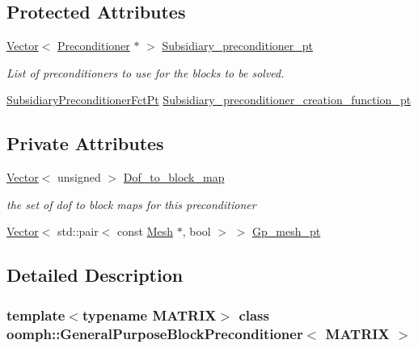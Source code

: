 \subsection*{Protected Attributes}
\begin{DoxyCompactItemize}
\item 
\hyperlink{classoomph_1_1Vector}{Vector}$<$ \hyperlink{classoomph_1_1Preconditioner}{Preconditioner} $\ast$ $>$ \hyperlink{classoomph_1_1GeneralPurposeBlockPreconditioner_a6bbfedf5de19fd5ee595e73dd8853d41}{Subsidiary\+\_\+preconditioner\+\_\+pt}
\begin{DoxyCompactList}\small\item\em List of preconditioners to use for the blocks to be solved. \end{DoxyCompactList}\item 
\hyperlink{classoomph_1_1GeneralPurposeBlockPreconditioner_a4818c6bde7206cd9b5df4f8c1e3a3c34}{Subsidiary\+Preconditioner\+Fct\+Pt} \hyperlink{classoomph_1_1GeneralPurposeBlockPreconditioner_a5c29b06a7668e63309cfe27efdf1a60a}{Subsidiary\+\_\+preconditioner\+\_\+creation\+\_\+function\+\_\+pt}
\end{DoxyCompactItemize}
\subsection*{Private Attributes}
\begin{DoxyCompactItemize}
\item 
\hyperlink{classoomph_1_1Vector}{Vector}$<$ unsigned $>$ \hyperlink{classoomph_1_1GeneralPurposeBlockPreconditioner_a098199f5d175c6357aa74d2b40f4540d}{Dof\+\_\+to\+\_\+block\+\_\+map}
\begin{DoxyCompactList}\small\item\em the set of dof to block maps for this preconditioner \end{DoxyCompactList}\item 
\hyperlink{classoomph_1_1Vector}{Vector}$<$ std\+::pair$<$ const \hyperlink{classoomph_1_1Mesh}{Mesh} $\ast$, bool $>$ $>$ \hyperlink{classoomph_1_1GeneralPurposeBlockPreconditioner_a7d4b1aedf5b481972a3a13f6f5e06720}{Gp\+\_\+mesh\+\_\+pt}
\end{DoxyCompactItemize}


\subsection{Detailed Description}
\subsubsection*{template$<$typename M\+A\+T\+R\+IX$>$\newline
class oomph\+::\+General\+Purpose\+Block\+Preconditioner$<$ M\+A\+T\+R\+I\+X $>$}

